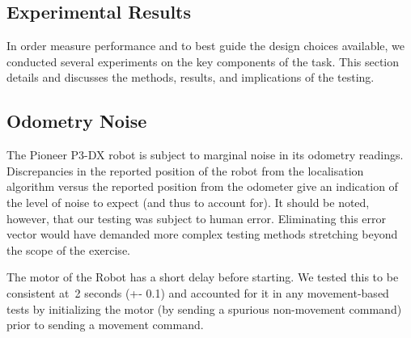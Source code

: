 \documentclass{article}
\begin{document}
	\begin{multicols}{2}
    \section{Experimental Results}
	In order measure performance and to best guide the design choices available, we conducted several experiments on the key components of the task. This section details and discusses the methods, results, and implications of the testing.

	\subsection{Odometry Noise}
	The Pioneer P3-DX robot is subject to marginal noise in its odometry readings. Discrepancies in the reported position of the robot from the localisation algorithm versus the reported position from the odometer give an indication of the level of noise to expect (and thus to account for). It should be noted, however, that our testing was subject to human error. Eliminating this error vector would have demanded more complex testing methods stretching beyond the scope of the exercise.

The motor of the Robot has a short delay before starting. We tested this to be consistent at~2 seconds (+- 0.1) and accounted for it in any movement-based tests by initializing the motor (by sending a spurious non-movement command) prior to sending a movement command.


\end{multicols}
\end{document}
